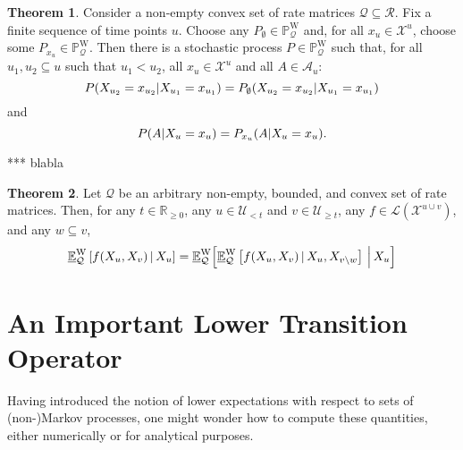 \documentclass[10pt]{paper}
\theoremstyle{definition}
\newtheorem{theorem}{Theorem}
\newcommand{\reals}{\mathbb{R}}
\newcommand{\realsnonneg}{\reals_{\geq 0}}
\newcommand{\states}{\mathcal{X}}
\newcommand{\processes}{\mathbb{P}}
\newcommand{\wprocesses}{\processes^{\mathrm{W}}}
\newcommand{\gambles}{\mathcal{L}}
\newcommand{\rateset}{\mathcal{Q}}
\begin{document}
\begin{theorem}\label{theo:aanelkaarplakken}
Consider a non-empty convex set of rate matrices $\rateset\subseteq\mathcal{R}$.
Fix a finite sequence of time points $u$. Choose any $P_\emptyset\in\wprocesses_\rateset$ and, for all $x_u\in\states^u$, choose some $P_{x_u}\in\wprocesses_\rateset$. Then there is a stochastic process $P\in\wprocesses_\rateset$ such that, for all $u_1,u_2\subseteq u$ such that $u_1<u_2$, all $x_u\in\states^u$ and all $A\in\mathcal{A}_u$:
\begin{equation}\label{eq:theo:aanelkaarplakken:equalsfirst}
P(X_{u_2}=x_{u_2}\vert X_{u_1}=x_{u_1})=P_{\emptyset}(X_{u_2}=x_{u_2}\vert X_{u_1}=x_{u_1})
\vspace{-7pt}
\end{equation}
and
\begin{equation}\label{eq:theo:aanelkaarplakken:equalssecond}
P(A\vert X_u=x_u)=P_{x_u}(A\vert X_u=x_u).
\vspace{7pt}
\end{equation}
\end{theorem}

*** blabla

\begin{theorem}\label{theorem:decomposition_multivar}
Let $\rateset$ be an arbitrary non-empty, bounded, and convex set of rate matrices. Then, for any $t\in\realsnonneg$, any $u\in\mathcal{U}_{<t}$ and $v\in\mathcal{U}_{\geq t}$, any $f\in\gambles(\states^{u\cup v})$, and any $w\subseteq v$,
\begin{equation}\label{eq:lower_exp_factorizes}
\underline{\mathbb{E}}^{\mathrm{W}}_\rateset\left[f(X_u,X_v)\,\vert\,X_u\right] = \underline{\mathbb{E}}^{\mathrm{W}}_\rateset\Bigl[\underline{\mathbb{E}}^{\mathrm{W}}_\rateset\left[f(X_u,X_v)\,\vert\,X_u,X_{v\setminus w}\right] \,\Big\vert\,X_u\Bigr] 
\end{equation}
\end{theorem}

\section{An Important Lower Transition Operator}
\label{sec:lowertrans}

Having introduced the notion of lower expectations with respect to sets of (non-)Markov processes, one might wonder how to compute these quantities, either numerically or for analytical purposes. 
\end{document}

